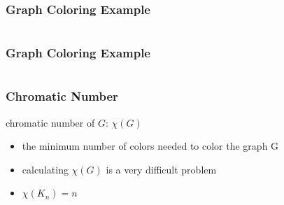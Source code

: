 \documentclass[dvipsnames]{beamer}
\begin{document}
\begin{frame}
  \frametitle{Graph Coloring Example}

  \begin{example}
    \begin{columns}
      \begin{center}
      \end{center}

      \begin{center}
      \end{center}
    \end{columns}
  \end{example}
\end{frame}

\begin{frame}
  \frametitle{Graph Coloring Example}

  \begin{example}
    \begin{columns}
      \begin{center}
      \end{center}

      \begin{center}
      \end{center}
    \end{columns}
  \end{example}
\end{frame}

\begin{frame}
  \frametitle{Chromatic Number}

  \begin{definition}
    \alert{chromatic number} of $G$: $\chi (G)$
    \begin{itemize}
      \item the minimum number of colors needed to color the graph G
    \end{itemize}
  \end{definition}

  \pause
  \begin{itemize}
     \item calculating $\chi (G)$ is a very difficult problem
     \item $\chi (K_n) = n$
  \end{itemize}
\end{frame}
\end{document}
